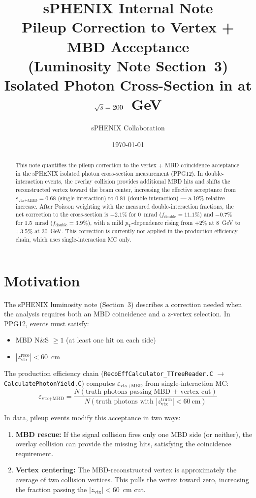 \documentclass[11pt,letterpaper]{article}
\title{%
  \vspace{-1cm}
  {\large \textbf{sPHENIX Internal Note}}\\[0.5cm]
  {\LARGE \textbf{Pileup Correction to Vertex + MBD Acceptance\\
  (Luminosity Note Section~3)}}\\[0.3cm]
  {\large Isolated Photon Cross-Section in \pp{} at $\mbox{$\sqrt{s}$} = 200$~GeV}
}
\author{sPHENIX Collaboration}
\date{\today}
\newcommand{\pT}{\ensuremath{p_{\text{T}}}}
\newcommand{\vtxeff}{\ensuremath{\varepsilon_{\text{vtx+MBD}}}}
\newcommand{\fdouble}{\ensuremath{f_{\text{double}}}}
\begin{document}
\maketitle

\begin{abstract}
This note quantifies the pileup correction to the vertex + MBD
coincidence acceptance in the sPHENIX isolated photon cross-section
measurement (PPG12). In double-interaction events, the overlay
collision provides additional MBD hits and shifts the reconstructed
vertex toward the beam center, increasing the effective acceptance
from $\vtxeff = 0.68$ (single interaction) to $0.81$ (double
interaction) --- a 19\% relative increase. After Poisson weighting
with the measured double-interaction fractions, the net correction
to the cross-section is $-2.1\%$ for 0~mrad ($\fdouble = 11.1\%$)
and $-0.7\%$ for 1.5~mrad ($\fdouble = 3.9\%$), with a mild
$\pT$-dependence rising from $+2\%$ at 8~GeV to $+3.5\%$ at
30~GeV. This correction is currently not applied in the production
efficiency chain, which uses single-interaction MC only.
\end{abstract}

\tableofcontents
\newpage

\section{Motivation}
\label{sec:motivation}

The sPHENIX luminosity note (Section~3) describes a correction
needed when the analysis requires both an MBD coincidence and a
z-vertex selection. In PPG12, events must satisfy:
\begin{itemize}
  \item MBD N\&S $\geq 1$ (at least one hit on each side)
  \item $|z_{\text{vtx}}^{\text{reco}}| < 60$~cm
\end{itemize}

The production efficiency chain (\texttt{RecoEffCalculator\_TTreeReader.C}
$\to$ \texttt{CalculatePhotonYield.C}) computes \vtxeff{} from
single-interaction MC:
\begin{equation}
  \vtxeff = \frac{N(\text{truth photons passing MBD + vertex cut})}
                 {N(\text{truth photons with } |z_{\text{vtx}}^{\text{truth}}| < 60~\text{cm})}
  \label{eq:vtxeff}
\end{equation}

In data, pileup events modify this acceptance in two ways:
\begin{enumerate}
  \item \textbf{MBD rescue:} If the signal collision fires only one
    MBD side (or neither), the overlay collision can provide the
    missing hits, satisfying the coincidence requirement.
  \item \textbf{Vertex centering:} The MBD-reconstructed vertex is
    approximately the average of two collision vertices. This pulls
    the vertex toward zero, increasing the fraction passing the
    $|z_{\text{vtx}}| < 60$~cm cut.
\end{enumerate}
\end{document}
